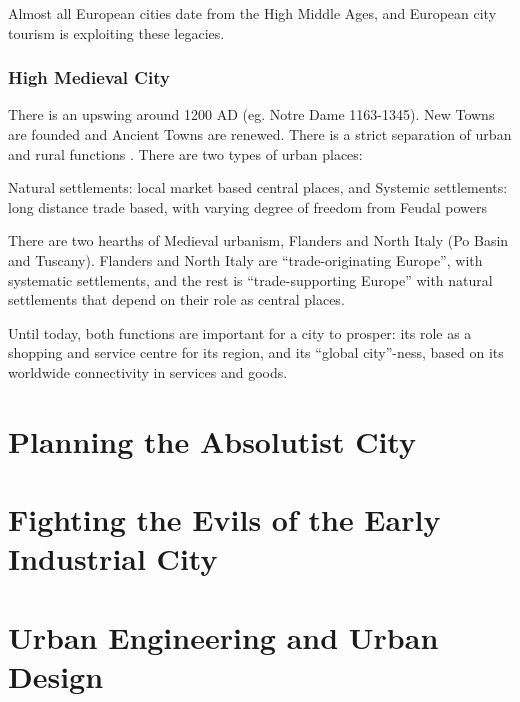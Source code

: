 \documentclass{article}
\newcommand{\alignedmarginpar}[1]{%
        \marginpar{\raggedright\small #1}
    }
\begin{document}
Almost all European cities date from the High Middle Ages, and European city tourism is exploiting these legacies.

\subsubsection{High Medieval City}


There is an upswing around 1200 AD (eg. Notre Dame 1163-1345). New Towns are founded and Ancient Towns are renewed. There is a strict separation of urban and rural functions\alignedmarginpar{ref. Max Weber}. There are two types of urban places:

\begin{outline}
	\1 Natural settlements: local market based central places, and
	\1 Systemic settlements: long distance trade based, with varying degree of freedom from Feudal powers
\end{outline}

There are two hearths of Medieval urbanism, Flanders and North Italy (Po Basin and Tuscany). Flanders and North Italy are ``trade-originating Europe'', with systematic settlements, and the rest is ``trade-supporting Europe'' with natural settlements that depend on their role as central places.

Until today, both functions are important for a city to prosper: its role as a shopping and service centre for its region, and its ``global city''-ness, based on its worldwide connectivity in services and goods.



\section{Planning the Absolutist City}

\section{Fighting the Evils of the Early Industrial City}

\section{Urban Engineering and Urban Design}
\end{document}

